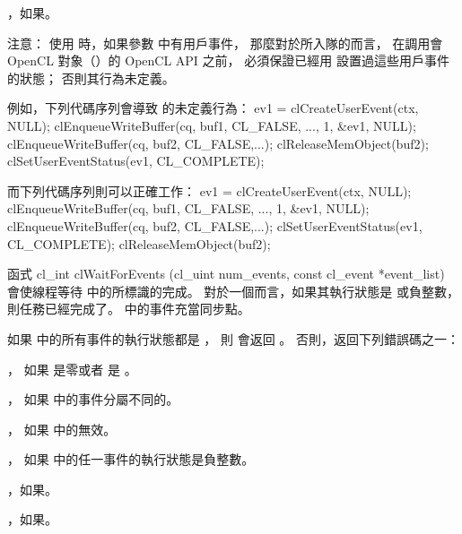 \item {}，如果\schostfailres。
\stopigBase

注意：
使用  時，如果參數  中有用戶事件，
那麼對於所入隊的而言，
在調用會 OpenCL 對象（）的 OpenCL API 之前，
必須保證已經用  設置過這些用戶事件的狀態；
否則其行為未定義。

例如，下列代碼序列會導致  的未定義行為：
\startclc
ev1 = clCreateUserEvent(ctx, NULL);
clEnqueueWriteBuffer(cq, buf1, CL_FALSE, ...,
				1, &ev1, NULL);
clEnqueueWriteBuffer(cq, buf2, CL_FALSE,...);
clReleaseMemObject(buf2);
clSetUserEventStatus(ev1, CL_COMPLETE);
\stopclc

而下列代碼序列則可以正確工作：
\startclc
ev1 = clCreateUserEvent(ctx, NULL);
clEnqueueWriteBuffer(cq, buf1, CL_FALSE, ...,
				1, &ev1, NULL);
clEnqueueWriteBuffer(cq, buf2, CL_FALSE,...);
clSetUserEventStatus(ev1, CL_COMPLETE);
clReleaseMemObject(buf2);
\stopclc

函式
\startclc
cl_int clWaitForEvents (cl_uint num_events, const cl_event *event_list)
\stopclc
會使線程等待  中的所標識的完成。
對於一個而言，如果其執行狀態是  或負整數，則任務已經完成了。
  中的事件充當同步點。

如果  中的所有事件的執行狀態都是 ，
則  會返回 。
否則，返回下列錯誤碼之一：
\startigBase
\item {}，
如果  是零或者  是 。

\item {}，
如果  中的事件分屬不同的。

\item {}，
如果  中的無效。

\item {}，
如果  中的任一事件的執行狀態是負整數。

\item {}，如果\scdevfailres。

\item {}，如果\schostfailres。
\stopigBase

